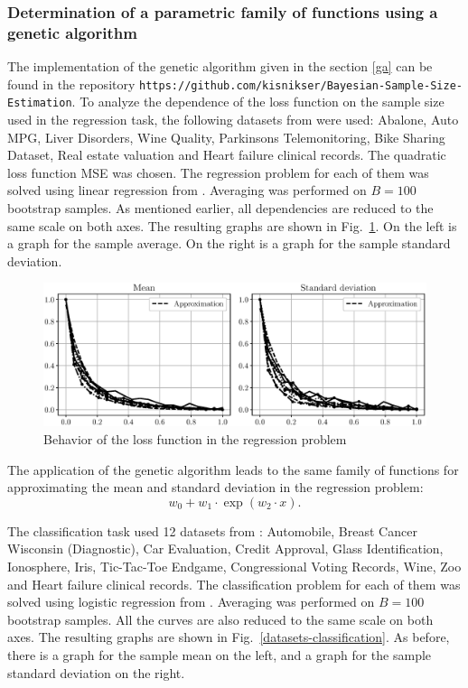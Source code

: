 \documentclass[
11pt,%
tightenlines,%
twoside,%
onecolumn,%
nofloats,%
nobibnotes,%
nofootinbib,%
superscriptaddress,%
noshowpacs,%
centertags]%
{revtex4-2}
\begin{document}
\subsubsection{Determination of a parametric family of functions using a genetic algorithm}

The implementation of the genetic algorithm given in the section \ref{ga} can be found in the repository \texttt{https://github.com/kisnikser/Bayesian-Sample-Size-Estimation}. To analyze the dependence of the loss function on the sample size used in the regression task, the following datasets from \citep{UCI} were used: Abalone, Auto MPG, Liver Disorders, Wine Quality, Parkinsons Telemonitoring, Bike Sharing Dataset, Real estate valuation and Heart failure clinical records. The quadratic loss function MSE was chosen. The regression problem for each of them was solved using linear regression from \citep{scikit-learn}. Averaging was performed on $B = 100$ bootstrap samples. As mentioned earlier, all dependencies are reduced to the same scale on both axes. The resulting graphs are shown in Fig.~\ref{datasets-regression}. On the left is a graph for the sample average. On the right is a graph for the sample standard deviation.

\begin{figure}[h!]
    \centering
    \includegraphics[width=\textwidth]{../paper/figures/gray/eps/datasets-regression}
    \caption{Behavior of the loss function in the regression problem}
    \label{datasets-regression}
\end{figure}

The application of the genetic algorithm leads to the same family of functions for approximating the mean and standard deviation in the regression problem:
\[ w_0 + w_1 \cdot \exp(w_2 \cdot x). \]

The classification task used 12 datasets from \citep{UCI}: Automobile, Breast Cancer Wisconsin (Diagnostic), Car Evaluation, Credit Approval, Glass Identification, Ionosphere, Iris, Tic-Tac-Toe Endgame, Congressional Voting Records, Wine, Zoo and Heart failure clinical records. The classification problem for each of them was solved using logistic regression from \citep{scikit-learn}. Averaging was performed on $B = 100$ bootstrap samples. All the curves are also reduced to the same scale on both axes. The resulting graphs are shown in Fig.~\ref{datasets-classification}. As before, there is a graph for the sample mean on the left, and a graph for the sample standard deviation on the right.
\end{document}
